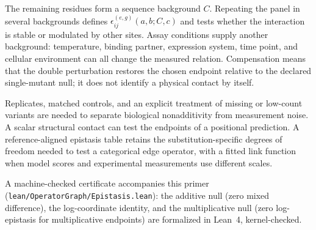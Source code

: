 The remaining residues form a sequence background $C$.  Repeating the panel in several backgrounds
defines $\epsilon_{ij}^{(e,g)}(a,b;C,c)$ and tests whether the interaction is stable or modulated by other
sites.  Assay conditions supply another background: temperature, binding partner, expression
system, time point, and cellular environment can all change the measured relation.  Compensation
means that the double perturbation restores the chosen endpoint relative to the declared
single-mutant null; it does not identify a physical contact by itself.

Replicates, matched controls, and an explicit treatment of missing or low-count variants are needed
to separate biological nonadditivity from measurement noise.  A scalar structural contact can test
the endpoints of a positional prediction.  A reference-aligned epistasis table retains the
substitution-specific degrees of freedom needed to test a categorical edge operator, with a fitted
link function when model scores and experimental measurements use different scales.

A machine-checked certificate accompanies this primer
(\texttt{lean/OperatorGraph/Epistasis.lean}): the additive null (zero
mixed difference), the log-coordinate identity, and the multiplicative null
(zero log-epistasis for multiplicative endpoints) are formalized in Lean~4,
kernel-checked.

